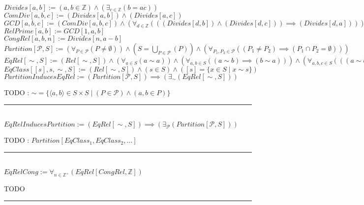 \documentclass{book}
\newcommand{\abr}{:=}
\newcommand{\st}{\mathbin{|}}
\begin{document}
$Divides[a, b] \abr (a, b \in \mathbb{Z}) \land (\exists_{c \in \mathbb{Z}}(b = a c))$ \\
$ComDiv[a, b, c] \abr (Divides[a, b]) \land (Divides[a, c])$ \\
$GCD[a, b, c] \abr (ComDiv[a, b, c]) \land (\forall_{d \in \mathbb{Z}}(((Divides[d, b]) \land (Divides[d, c])) \implies (Divides[d, a])))$ \\
$RelPrime[a, b] \abr GCD[1, a, b]$ \\
$CongRel[a, b, n] \abr Divides[n, a - b]$ \\

$Partition[\mathcal{P}, S] \abr (\forall_{P \in \mathcal{P}}(P \neq \emptyset)) \land (S = \bigcup\limits_{P \in \mathcal{P}}(P)) \land (\forall_{P_1, P_2 \in \mathcal{P}}((P_1 \neq P_2) \implies (P_1 \cap P_2 = \emptyset)))$ \\
$EqRel[\sim, S] \abr (Rel[\sim, S]) \land (\forall_{a \in S}(a \sim a)) \land (\forall_{a, b \in S}((a \sim b) \implies (b \sim a))) \land (\forall_{a, b, c \in S}(((a \sim b) \land (b \sim c)) \implies (a \sim c)))$ \\
$EqClass[[s], s, \sim, S] \abr (Rel[\sim, S]) \land (s \in S) \land ([s] = \{x \in S \st x \sim s\})$ \\

$PartitionInducesEqRel \abr (Partition[\mathcal{P}, S]) \implies (\exists_{\sim}(EqRel[\sim, S]))$
\begin{enumerate}
  \lit TODO : $\sim = \{\langle a, b \rangle \in S \times S \st (P \in \mathcal{P}) \land (a, b \in P)\}$
\end{enumerate} \vspace{.75mm} \hrule \vspace{.75mm} \ \\

$EqRelInducesPartition \abr (EqRel[\sim, S]) \implies (\exists_{\mathcal{P}}(Partition[\mathcal{P}, S]))$
\begin{enumerate}
  \lit TODO : $Partition[EqClass_1, EqClass_2, \ldots]$
\end{enumerate} \vspace{.75mm} \hrule \vspace{.75mm} \ \\

$EqRelCong \abr \forall_{n \in \mathbb{Z}^+}(EqRel[CongRel, \mathbb{Z}])$
\begin{enumerate}
  \lit TODO
\end{enumerate} \vspace{.75mm} \hrule \vspace{.75mm} \ \\
\end{document}
